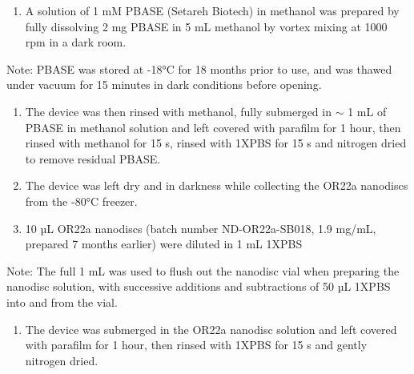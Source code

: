 \documentclass[
  a4paper,
]{scrbook}
\providecommand{\tightlist}{%
  \setlength{\itemsep}{0pt}\setlength{\parskip}{0pt}}\usepackage{longtable,booktabs,array}
\begin{document}
\begin{enumerate}
\def\labelenumi{\arabic{enumi}.}
\setcounter{enumi}{2}
\tightlist
\item
  A solution of 1 mM PBASE (Setareh Biotech) in methanol was prepared by
  fully dissolving 2 mg PBASE in 5 mL methanol by vortex mixing at 1000
  rpm in a dark room.
\end{enumerate}

Note: PBASE was stored at -18°C for 18 months prior to use, and was
thawed under vacuum for 15 minutes in dark conditions before opening.

\begin{enumerate}
\def\labelenumi{\arabic{enumi}.}
\setcounter{enumi}{3}
\item
  The device was then rinsed with methanol, fully submerged in \(\sim\)
  1 mL of PBASE in methanol solution and left covered with parafilm for
  1 hour, then rinsed with methanol for 15 s, rinsed with 1XPBS for 15 s
  and nitrogen dried to remove residual PBASE.
\item
  The device was left dry and in darkness while collecting the OR22a
  nanodiscs from the -80°C freezer.
\item
  10 µL OR22a nanodiscs (batch number ND-OR22a-SB018, 1.9 mg/mL,
  prepared 7 months earlier) were diluted in 1 mL 1XPBS
\end{enumerate}

Note: The full 1 mL was used to flush out the nanodisc vial when
preparing the nanodisc solution, with successive additions and
subtractions of 50 µL 1XPBS into and from the vial.

\begin{enumerate}
\def\labelenumi{\arabic{enumi}.}
\setcounter{enumi}{6}
\tightlist
\item
  The device was submerged in the OR22a nanodisc solution and left
  covered with parafilm for 1 hour, then rinsed with 1XPBS for 15 s and
  gently nitrogen dried.
\end{enumerate}
\end{document}
